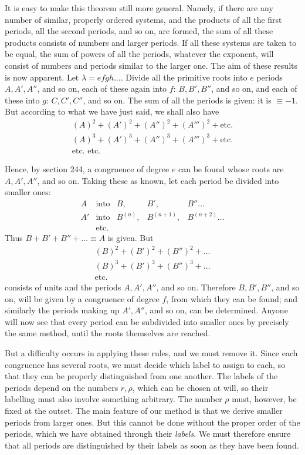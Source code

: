 It is easy to make this theorem still more general. Namely, if there are any number of similar, properly ordered systems, and the products of all the first periods, all the second periods, and so on, are formed, the sum of all these products consists of numbers and larger periods. If all these systems are taken to be equal, the sum of powers of all the periods, whatever the exponent, will consist of numbers and periods similar to the larger one. The aim of these results is now apparent. Let $\lambda=efgh\ldots$. Divide all the primitive roots into $e$ periods $A,A',A''$, and so on, each of these again into $f$: $B,B',B''$, and so on, and each of these into $g$: $C,C',C''$, and so on. The sum of all the periods is given: it is $\equiv-1$. But according to what we have just said, we shall also have
\[
\begin{gathered}
(A)^2+(A')^2+(A'')^2+(A''')^2+\text{etc.}\\
(A)^3+(A')^3+(A'')^3+(A''')^3+\text{etc.}\\
\text{etc. etc.}
\end{gathered}
\]

Hence, by section 244, a congruence of degree $e$ can be found whose roots are $A,A',A''$, and so on. Taking these as known, let each period be divided into smaller ones:
\[
\begin{array}{rclll}
A&\text{into}&B,&B',&B''\ldots\\
A'&\text{into}&B^{(n)},&B^{(n+1)},&B^{(n+2)}\ldots\\
&\text{etc.}
\end{array}
\]
Thus $B+B'+B''+\ldots\equiv A$ is given. But
\[
\begin{gathered}
(B)^2+(B')^2+(B'')^2+\ldots\\
(B)^3+(B')^3+(B'')^3+\ldots\\
\text{etc.}
\end{gathered}
\]
consists of units and the periods $A,A',A''$, and so on. Therefore $B,B',B''$, and so on, will be given by a congruence of degree $f$, from which they can be found; and similarly the periods making up $A',A''$, and so on, can be determined. Anyone will now see that every period can be subdivided into smaller ones by precisely the same method, until the roots themselves are reached.

But a difficulty occurs in applying these rules, and we must remove it. Since each congruence has several roots, we must decide which label to assign to each, so that they can be properly distinguished from one another. The labels of the periods depend on the numbers $r,\rho$, which can be chosen at will, so their labelling must also involve something arbitrary. The number $\rho$ must, however, be fixed at the outset. The main feature of our method is that we derive smaller periods from larger ones. But this cannot be done without the proper order of the periods, which we have obtained through their \emph{labels}. We must therefore ensure that all periods are distinguished by their labels as soon as they have been found.

